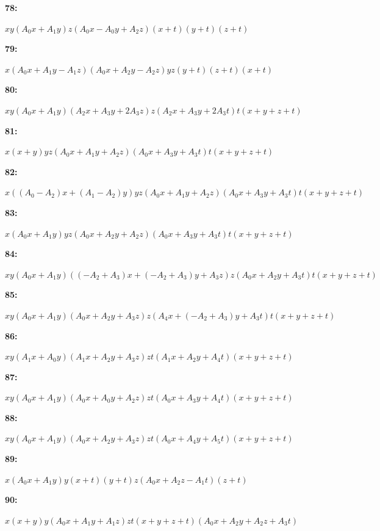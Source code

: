 \documentclass[12pt]{amsart}
\theoremstyle{plain}
\theoremstyle{remark}
\theoremstyle{definition}
\numberwithin{table}{section}
\begin{document}
\noindent\parbox[right]{9mm}{\textbf{78:}}\parbox{3mm}{\hfill}%
\parbox[t]{15cm}{\(xy(A_{0}x + A_{1}y)z(A_{0}x - A_{0}y + A_{2}z)(x + t)(y + t)(z + t)\)}

\noindent\parbox[right]{9mm}{\textbf{79:}}\parbox{3mm}{\hfill}%
\parbox[t]{15cm}{\(x(A_{0}x + A_{1}y - A_{1}z)(A_{0}x + A_{2}y - A_{2}z)yz(y + t)(z + t)(x + t)\)}

\noindent\parbox[right]{9mm}{\textbf{80:}}\parbox{3mm}{\hfill}%
\parbox[t]{15cm}{\(xy(A_{0}x + A_{1}y)(A_{2}x + A_{3}y + 2A_{3}z)z(A_{2}x + A_{3}y + 2A_{3}t)t(x + y + z + t)\)}

\noindent\parbox[right]{9mm}{\textbf{81:}}\parbox{3mm}{\hfill}%
\parbox[t]{15cm}{\(x(x + y)yz(A_{0}x + A_{1}y + A_{2}z)(A_{0}x + A_{3}y + A_{3}t)t(x + y + z + t)\)}

\noindent\parbox[right]{9mm}{\textbf{82:}}\parbox{3mm}{\hfill}%
\parbox[t]{15cm}{\(x((A_{0} - A_{2})x + (A_{1} - A_{2})y)yz(A_{0}x + A_{1}y + A_{2}z)(A_{0}x + A_{3}y + A_{3}t)t(x + y + z + t)\)}

\noindent\parbox[right]{9mm}{\textbf{83:}}\parbox{3mm}{\hfill}%
\parbox[t]{15cm}{\(x(A_{0}x + A_{1}y)yz(A_{0}x + A_{2}y + A_{2}z)(A_{0}x + A_{3}y + A_{3}t)t(x + y + z + t)\)}

\noindent\parbox[right]{9mm}{\textbf{84:}}\parbox{3mm}{\hfill}%
\parbox[t]{15cm}{\(xy(A_{0}x + A_{1}y)((-A_{2} + A_{3})x + (-A_{2} + A_{3})y + A_{3}z)z(A_{0}x + A_{2}y + A_{3}t)t(x + y + z + t)\)}

\noindent\parbox[right]{9mm}{\textbf{85:}}\parbox{3mm}{\hfill}%
\parbox[t]{15cm}{\(xy(A_{0}x + A_{1}y)(A_{0}x + A_{2}y + A_{3}z)z(A_{4}x + (-A_{2} + A_{3})y + A_{3}t)t(x + y + z + t)\)}

\noindent\parbox[right]{9mm}{\textbf{86:}}\parbox{3mm}{\hfill}%
\parbox[t]{15cm}{\(xy(A_{1}x + A_{0}y)(A_{1}x + A_{2}y + A_{3}z)zt(A_{1}x + A_{2}y + A_{4}t)(x + y + z + t)\)}

\noindent\parbox[right]{9mm}{\textbf{87:}}\parbox{3mm}{\hfill}%
\parbox[t]{15cm}{\(xy(A_{0}x + A_{1}y)(A_{0}x + A_{0}y + A_{2}z)zt(A_{0}x + A_{3}y + A_{4}t)(x + y + z + t)\)}

\noindent\parbox[right]{9mm}{\textbf{88:}}\parbox{3mm}{\hfill}%
\parbox[t]{15cm}{\(xy(A_{0}x + A_{1}y)(A_{0}x + A_{2}y + A_{3}z)zt(A_{0}x + A_{4}y + A_{5}t)(x + y + z + t)\)}

\noindent\parbox[right]{9mm}{\textbf{89:}}\parbox{3mm}{\hfill}%
\parbox[t]{15cm}{\(x(A_{0}x + A_{1}y)y(x + t)(y + t)z(A_{0}x + A_{2}z - A_{1}t)(z + t)\)}

\noindent\parbox[right]{9mm}{\textbf{90:}}\parbox{3mm}{\hfill}%
\parbox[t]{15cm}{\(x(x + y)y(A_{0}x + A_{1}y + A_{1}z)zt(x + y + z + t)(A_{0}x + A_{2}y + A_{2}z + A_{3}t)\)}
\end{document}
